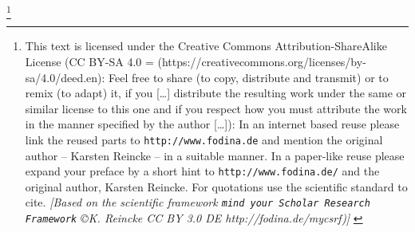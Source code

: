 %
%
%
%

\footnote{This text is licensed under the Creative Commons
Attribution-ShareAlike License (CC BY-SA 4.0 =
(https://creativecommons.org/licenses/by-sa/4.0/deed.en): Feel free \glqq{}to
share (to copy, distribute and transmit)\grqq{} or \glqq{}to remix (to
adapt)\grqq{} it, if you \glqq{}[\ldots] distribute the resulting work under the
same or similar license to this one\grqq{} and if you respect how \glqq{}you
must attribute the work in the manner specified by the author [\ldots]\grqq{}):
\newline
In an internet based reuse please link the reused parts to
\texttt{http://www.fodina.de} and mention the original author -- Karsten Reincke
-- in a suitable manner. In a paper-like reuse please expand your preface by a
short hint to \texttt{http://www.fodina.de/} and the original author, Karsten
Reincke. For quotations use the scientific standard to cite.
\newline
{ \tiny \itshape [Based on the scientific framework \texttt{mind your Scholar
Research Framework} \copyright K. Reincke CC BY 3.0 DE http://fodina.de/mycsrf)]
}}
